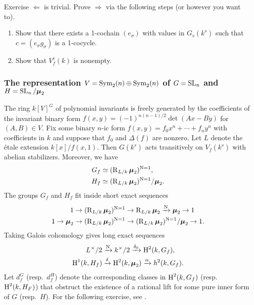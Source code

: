 \begin{enonce*}[remark]{Exercise}
$\Leftarrow$ is trivial. Prove $\Rightarrow$ via the following steps (or 
however you want to). 
\begin{enumerate}
  \item Show that there exists a 1-cochain $(e_\sigma)$ with values in 
    $G_v(k^s)$ such that $c=(e_\sigma g_\sigma)$ is a 1-cocycle. 
  \item Show that $V_f^c(k)$ is nonempty. 
\end{enumerate}
\end{enonce*}


\subsubsection{The representation $V=\operatorname{Sym}_2(n)\oplus \operatorname{Sym}_2(n)$ of $G=\operatorname{SL}_n$ and $H=\operatorname{SL}_n/\boldsymbol\mu_2$}

The ring $k[V]^G$ of polynomial invariants is freely generated by the 
coefficients of the invariant binary form $f(x,y)=(-1)^{n(n-1)/2}\det(A x-B y)$ 
for $(A,B)\in V$. Fix some binary $n$-ic form 
$f(x,y) = f_0 x^n + \cdots + f_n y^n$ with coefficients in $k$ and suppose that 
$f_0$ and $\Delta(f)$ are nonzero. Let $L$ denote the \'etale extension 
$k[x]/f(x,1)$. Then $G(k^s)$ acts transitively on $V_f(k^s)$ with abelian 
stabilizers. Moreover, we have 
\begin{align*}
  G_f &\simeq (\operatorname{R}_{L/k}\boldsymbol\mu_2)^{\operatorname{N}=1} , \\
  H_f &\simeq (\operatorname{R}_{L/k}\boldsymbol\mu_2)^{\operatorname{N}=1}/\boldsymbol\mu_2 .
\end{align*}
The groups $G_f$ and $H_f$ fit inside short exact sequences 
\begin{align*}
  1 \to (\operatorname{R}_{L/k}\boldsymbol\mu_2)^{\operatorname{N}=1} &\to \operatorname{R}_{L/k}\boldsymbol\mu_2 \xrightarrow{\operatorname{N}} \boldsymbol\mu_2 \to 1 \\
  1 \to \boldsymbol\mu_2 \to (\operatorname{R}_{L/k}\boldsymbol\mu_2)^{\operatorname{N}=1} &\to (\operatorname{R}_{L/k}\boldsymbol\mu_2)^{\operatorname{N}=1}/\boldsymbol\mu_2 \to 1 .
\end{align*}
Taking Galois cohomology gives long exact sequences 
\begin{align*}
  L^\times / 2 &\xrightarrow{\operatorname{N}} k^\times / 2 \xrightarrow{\delta_0} \operatorname{H}^2(k,G_f) , \\
  \operatorname{H}^1(k,H_f) &\xrightarrow{\delta} \operatorname{H}^2(k,\boldsymbol\mu_2) \xrightarrow\alpha h^2(k,G_f) .
\end{align*}
Let $d_f^G$ (resp.~$d_f^H$) denote the corresponding classes in $\operatorname{H}^2(k,G_f)$ 
(resp.~$\operatorname{H}^2(k,H_F)$) that obstruct the existence of a rational lift for some 
pure inner form of $G$ (resp.~$H$). For the following exercise, see 
\cite[\S 4.5]{bgw13}. 

